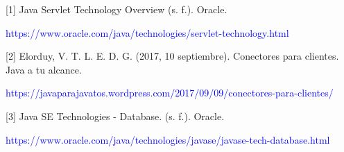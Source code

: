 \documentclass[titlepage, 12pt]{article}
\begin{document}
[1] Java Servlet Technology Overview (s. f.). Oracle.\par\vspace{0.1cm}
\textcolor{blue}{https://www.oracle.com/java/technologies/servlet-technology.html} \par\vspace{0.5cm}

[2] Elorduy, V. T. L. E. D. G. (2017, 10 septiembre). Conectores para clientes. Java a tu alcance. \par\vspace{0.1cm} \textcolor{blue}{https://javaparajavatos.wordpress.com/2017/09/09/conectores-para-clientes/} \par\vspace{0.5cm}

[3] Java SE Technologies - Database. (s. f.). Oracle. \par\vspace{0.1cm} \textcolor{blue}{https://www.oracle.com/java/technologies/javase/javase-tech-database.html} \par\vspace{0.5cm}
\end{document}
